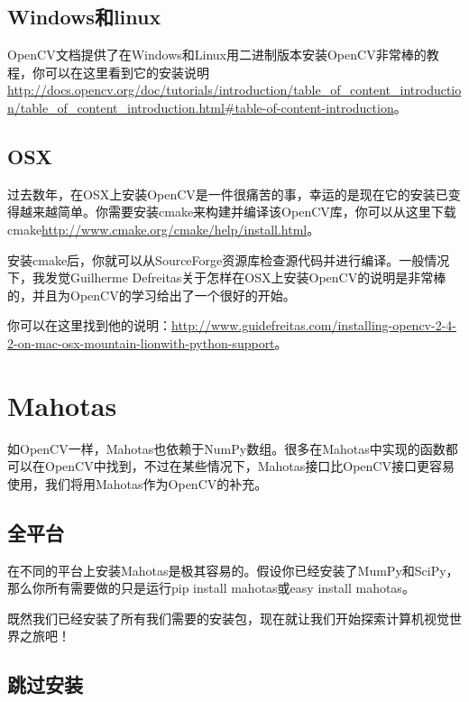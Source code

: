 \documentclass[color=cyan,mathpazo,titlestyle=hang]{elegantbook}
\begin{document}
\subsection{Windows和linux}

OpenCV文档提供了在Windows和Linux用二进制版本安装OpenCV非常棒的教程，你可以在这里看到它的安装说明\url{http://docs.opencv.org/doc/tutorials/introduction/table_of_content_introduction/table_of_content_introduction.html#table-of-content-introduction}。

\subsection{OSX}

过去数年，在OSX上安装OpenCV是一件很痛苦的事，幸运的是现在它的安装已变得越来越简单。你需要安装cmake来构建并编译该OpenCV库，你可以从这里下载cmake\href{http://www.cmake.org/cmake/help/install.html}{http://www.cmake.org/cmake/help/install.html}。

安装cmake后，你就可以从SourceForge资源库检查源代码并进行编译。一般情况下，我发觉Guilherme Defreitas关于怎样在OSX上安装OpenCV的说明是非常棒的，并且为OpenCV的学习给出了一个很好的开始。

你可以在这里找到他的说明：\href{http://www.guidefreitas.com/installing-opencv-2-4-2-on-mac-osx-mountain-lionwith-python-support}{http://www.guidefreitas.com/installing-opencv-2-4-2-on-mac-osx-mountain-lionwith-python-support}。

\section{Mahotas}

如OpenCV一样，Mahotas也依赖于NumPy数组。很多在Mahotas中实现的函数都可以在OpenCV中找到，不过在某些情况下，Mahotas接口比OpenCV接口更容易使用，我们将用Mahotas作为OpenCV的补充。

\subsection{全平台}

在不同的平台上安装Mahotas是极其容易的。假设你已经安装了MumPy和SciPy，那么你所有需要做的只是运行pip install mahotas或easy install mahotas。

既然我们已经安装了所有我们需要的安装包，现在就让我们开始探索计算机视觉世界之旅吧！

\subsection{跳过安装}
\end{document}

